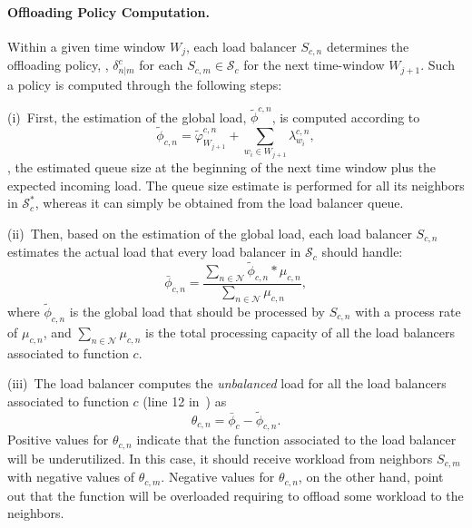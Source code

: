 \paragraph{Offloading Policy Computation.} 
Within a given time window $W_{j}$, each load balancer $S_{c,n}$ determines the offloading policy, \ie, $\delta_{n|m}^c$ for each $S_{c,m} \in \mathcal{S}_{c}$ for the next time-window $W_{j+1}$. Such a policy is computed through the following steps: 

(i)~First, the estimation of the global load, $\tilde{\phi}^{c,n}$, is computed according to 
\begin{equation}
    \tilde{\phi}_{c,n} = \tilde{\varphi}^{c,n}_{W_{j+1}} + \sum_{w_i \in W_{j+1}} \lambda^{c,n}_{w_i},
    \label{eqn:global_load_estimation}
\end{equation}
\ie, the estimated queue size at the beginning of the next time window plus the expected incoming load.  The queue size estimate is performed for all its neighbors in $\mathcal{S}_{c}^*$, whereas it can simply be obtained from the load balancer queue.

(ii)~Then, based on the estimation of the global load, each load balancer $S_{c,n}$ estimates the actual load that every load balancer in $\mathcal{S}_{c}$ should handle:
\begin{equation}
    \bar{\phi}_{c,n} = \frac{\sum_{n \in \mathcal{N}}\tilde{\phi}_{c,n} * \mu_{c,n}}{\sum_{n \in \mathcal{N}} \mu_{c,n}}, %
    \label{eqn:balanced_load_estimation}
\end{equation}
where $\tilde{\phi}_{c,n}$ is the global load that should be processed by $S_{c,n}$ with a process rate of $\mu_{c,n}$, and $\sum_{n \in \mathcal{N}} \mu_{c,n}$ is the total processing capacity of all the load balancers associated to function $c$.

(iii)~The load balancer computes the \textit{unbalanced} load for all the load balancers associated to function $c$ (line 12 in~) as 
\begin{equation}
    \theta_{c,n} = \bar{\phi}_{c} - \tilde{\phi}_{c,n}. %
    \label{eqn:unbalanced_load_estimation}
\end{equation}
Positive values for $\theta_{c,n}$ indicate that the function associated to the load balancer will be underutilized. In this case, it should receive workload from neighbors $S_{c,m}$ with negative values of $\theta_{c,m}$. Negative values for $\theta_{c,n}$, on the other hand, point out that the function will be overloaded requiring to offload some workload to the neighbors.

